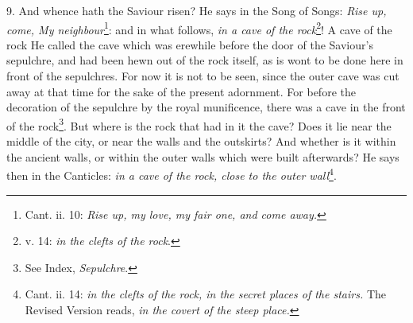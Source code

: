 9. And whence hath the Saviour risen? He says in the Song of Songs: \emph{Rise up, come, My neighbour}\footnote{Cant. ii. 10: \emph{Rise up, my love, my fair one, and come away.}}: and in what follows, \emph{in a cave of the rock}\footnote{v. 14: \emph{in the clefts of the rock}.}! A cave of the rock He called the cave which was erewhile before the door of the Saviour’s sepulchre, and had been hewn out of the rock itself, as is wont to be done here in front of the sepulchres. For now it is not to be seen, since the outer cave was cut away at that time for the sake of the present adornment. For before the decoration of the sepulchre by the royal munificence, there was a cave in the front of the rock\footnote{See Index, \emph{Sepulchre}.}. But where is the rock that had in it the cave? Does it lie near the middle of the city, or near the walls and the outskirts? And whether is it within the ancient walls, or within the outer walls which were built afterwards? He says then in the Canticles: \emph{in a cave of the rock, close to the outer wall}\footnote{Cant. ii. 14: \emph{in the clefts of the rock, in the secret places of the stairs.} The Revised Version reads, \emph{in the covert of the steep place.}}.

